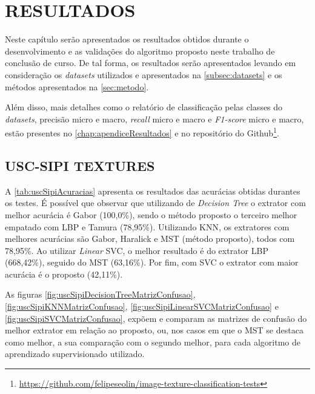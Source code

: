 
\chapter{RESULTADOS}
\label{chap:resultados}

\par Neste capítulo serão apresentados os resultados obtidos durante o desenvolvimento e as validações do algoritmo proposto neste trabalho de conclusão de curso. De tal forma, os resultados serão apresentados levando em consideração os \textit{datasets} utilizados e apresentados na \autoref{subsec:datasets} e os métodos apresentados na \autoref{sec:metodo}.
\par Além disso, mais detalhes como o relatório de classificação pelas classes do \textit{datasets}, precisão micro e macro, \textit{recall} micro e macro e \textit{F1-score} micro e macro, estão presentes no \autoref{chap:apendiceResultados} e no repositório do Github\footnote{\url{https://github.com/felipeseolin/image-texture-classification-tests}}.

\section{USC-SIPI TEXTURES}
\label{sec:uscSipiTextures}

A \autoref{tab:uscSipiAcuracias} apresenta os resultados das acurácias obtidas durantes os testes. É possível que observar que utilizando de \textit{Decision Tree} o extrator com melhor acurácia é Gabor (100,0\%), sendo o método proposto o terceiro melhor empatado com LBP e Tamura (78,95\%). Utilizando KNN, os extratores com melhores acurácias são Gabor, Haralick e MST (método proposto), todos com 78,95\%. Ao utilizar \textit{Linear} SVC, o melhor resultado é do extrator LBP (668,42\%), seguido do MST (63,16\%). Por fim, com SVC o extrator com maior acurácia é o proposto (42,11\%).



\par As figuras \ref{fig:uscSipiDecisionTreeMatrizConfusao}, \ref{fig:uscSipiKNNMatrizConfusao}, \ref{fig:uscSipiLinearSVCMatrizConfusao} e \ref{fig:uscSipiSVCMatrizConfusao}, expõem e comparam as matrizes de confusão do melhor extrator em relação ao proposto, ou, nos casos em que o MST se destaca como melhor, a sua comparação com o segundo melhor, para cada algoritmo de aprendizado supervisionado utilizado.

